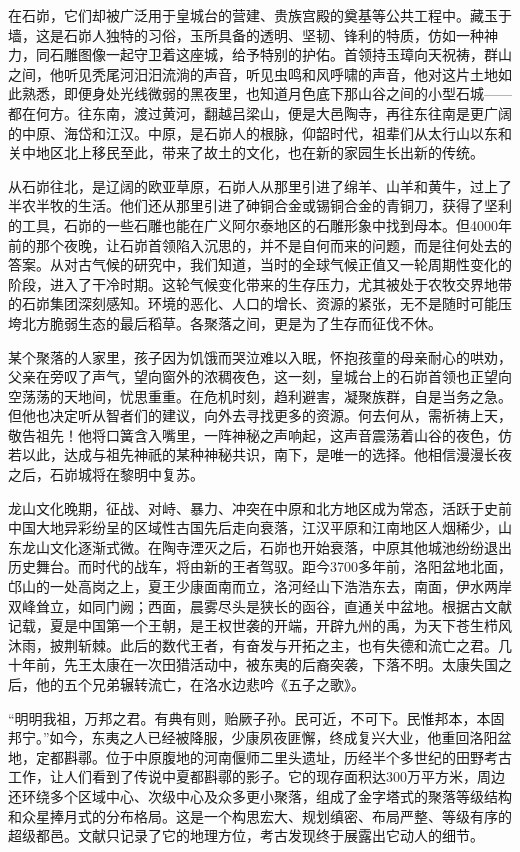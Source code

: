 在石峁，它们却被广泛用于皇城台的营建、贵族宫殿的奠基等公共工程中。藏玉于墙，这是石峁人独特的习俗，玉所具备的透明、坚韧、锋利的特质，仿如一种神力，同石雕图像一起守卫着这座城，给予特别的护佑。首领持玉璋向天祝祷，群山之间，他听见秃尾河汨汨流淌的声音，听见虫鸣和风呼啸的声音，他对这片土地如此熟悉，即便身处光线微弱的黑夜里，也知道月色底下那山谷之间的小型石城——都在何方。往东南，渡过黄河，翻越吕梁山，便是大邑陶寺，再往东往南是更广阔的中原、海岱和江汉。中原，是石峁人的根脉，仰韶时代，祖辈们从太行山以东和关中地区北上移民至此，带来了故土的文化，也在新的家园生长出新的传统。

从石峁往北，是辽阔的欧亚草原，石峁人从那里引进了绵羊、山羊和黄牛，过上了半农半牧的生活。他们还从那里引进了砷铜合金或锡铜合金的青铜刀，获得了坚利的工具，石峁的一些石雕也能在广义阿尔泰地区的石雕形象中找到母本。但4000年前的那个夜晚，让石峁首领陷入沉思的，并不是自何而来的问题，而是往何处去的答案。从对古气候的研究中，我们知道，当时的全球气候正值又一轮周期性变化的阶段，进入了干冷时期。这轮气候变化带来的生存压力，尤其被处于农牧交界地带的石峁集团深刻感知。环境的恶化、人口的增长、资源的紧张，无不是随时可能压垮北方脆弱生态的最后稻草。各聚落之间，更是为了生存而征伐不休。

某个聚落的人家里，孩子因为饥饿而哭泣难以入眠，怀抱孩童的母亲耐心的哄劝，父亲在旁叹了声气，望向窗外的浓稠夜色，这一刻，皇城台上的石峁首领也正望向空荡荡的天地间，忧思重重。在危机时刻，趋利避害，凝聚族群，自是当务之急。但他也决定听从智者们的建议，向外去寻找更多的资源。何去何从，需祈祷上天，敬告祖先！他将口簧含入嘴里，一阵神秘之声响起，这声音震荡着山谷的夜色，仿若以此，达成与祖先神祇的某种神秘共识，南下，是唯一的选择。他相信漫漫长夜之后，石峁城将在黎明中复苏。

龙山文化晚期，征战、对峙、暴力、冲突在中原和北方地区成为常态，活跃于史前中国大地异彩纷呈的区域性古国先后走向衰落，江汉平原和江南地区人烟稀少，山东龙山文化逐渐式微。在陶寺湮灭之后，石峁也开始衰落，中原其他城池纷纷退出历史舞台。而时代的战车，将由新的王者驾驭。距今3700多年前，洛阳盆地北面，邙山的一处高岗之上，夏王少康面南而立，洛河经山下浩浩东去，南面，伊水两岸双峰耸立，如同门阙；西面，晨雾尽头是狭长的函谷，直通关中盆地。根据古文献记载，夏是中国第一个王朝，是王权世袭的开端，开辟九州的禹，为天下苍生栉风沐雨，披荆斩棘。此后的数代王者，有奋发与开拓之主，也有失德和流亡之君。几十年前，先王太康在一次田猎活动中，被东夷的后裔突袭，下落不明。太康失国之后，他的五个兄弟辗转流亡，在洛水边悲吟《五子之歌》。

“明明我祖，万邦之君。有典有则，贻厥子孙。民可近，不可下。民惟邦本，本固邦宁。”如今，东夷之人已经被降服，少康夙夜匪懈，终成复兴大业，他重回洛阳盆地，定都斟鄩。位于中原腹地的河南偃师二里头遗址，历经半个多世纪的田野考古工作，让人们看到了传说中夏都斟鄩的影子。它的现存面积达300万平方米，周边还环绕多个区域中心、次级中心及众多更小聚落，组成了金字塔式的聚落等级结构和众星捧月式的分布格局。这是一个构思宏大、规划缜密、布局严整、等级有序的超级都邑。文献只记录了它的地理方位，考古发现终于展露出它动人的细节。

